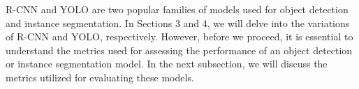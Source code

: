 

R-CNN and YOLO are two popular families of models used for object detection and instance segmentation. In Sections 3 and 4, we will delve into the variations of R-CNN and YOLO, respectively. However, before we proceed, it is essential to understand the metrics used for assessing the performance of an object detection or instance segmentation model. In the next subsection, we will discuss the metrics utilized for evaluating these models.

